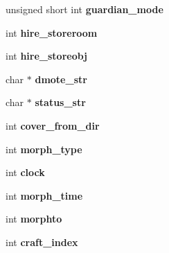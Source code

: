 \begin{DoxyCompactItemize}
\item 
\hypertarget{structchar__data_acc927dff260524dfe2d1c3aa03d50bbe}{unsigned short int {\bfseries guardian\-\_\-mode}}\label{structchar__data_acc927dff260524dfe2d1c3aa03d50bbe}

\item 
\hypertarget{structchar__data_ad46ddde1a852c228de15de95f0de3c75}{int {\bfseries hire\-\_\-storeroom}}\label{structchar__data_ad46ddde1a852c228de15de95f0de3c75}

\item 
\hypertarget{structchar__data_a23cad8e203644f51119757334f4bdee3}{int {\bfseries hire\-\_\-storeobj}}\label{structchar__data_a23cad8e203644f51119757334f4bdee3}

\item 
\hypertarget{structchar__data_ab0cb76f57656dd43658c57df531e4909}{char $\ast$ {\bfseries dmote\-\_\-str}}\label{structchar__data_ab0cb76f57656dd43658c57df531e4909}

\item 
\hypertarget{structchar__data_ab82112b1f66683c7cb9e4b179f130024}{char $\ast$ {\bfseries status\-\_\-str}}\label{structchar__data_ab82112b1f66683c7cb9e4b179f130024}

\item 
\hypertarget{structchar__data_a62aa4366178f94e076cb6cd675582827}{int {\bfseries cover\-\_\-from\-\_\-dir}}\label{structchar__data_a62aa4366178f94e076cb6cd675582827}

\item 
\hypertarget{structchar__data_a212312845f0361a710ecfe3109a5c2dc}{int {\bfseries morph\-\_\-type}}\label{structchar__data_a212312845f0361a710ecfe3109a5c2dc}

\item 
\hypertarget{structchar__data_a8ccd0ef401064315ddc7bf1341b5c8ca}{int {\bfseries clock}}\label{structchar__data_a8ccd0ef401064315ddc7bf1341b5c8ca}

\item 
\hypertarget{structchar__data_a5f7818c3273e045137f9c5d6cd77ac46}{int {\bfseries morph\-\_\-time}}\label{structchar__data_a5f7818c3273e045137f9c5d6cd77ac46}

\item 
\hypertarget{structchar__data_a23e3bdae1f1d30c8033fc7a7720ba2de}{int {\bfseries morphto}}\label{structchar__data_a23e3bdae1f1d30c8033fc7a7720ba2de}

\item 
\hypertarget{structchar__data_a8fde0f52ab2f67e0312518086a20715c}{int {\bfseries craft\-\_\-index}}\label{structchar__data_a8fde0f52ab2f67e0312518086a20715c}


\end{DoxyCompactItemize}
